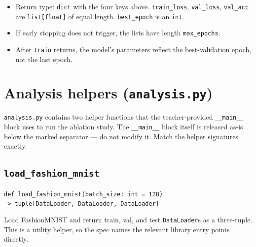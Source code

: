 \documentclass[11pt]{article}
\newcommand{\code}[1]{\texttt{\small #1}}
\begin{document}
\begin{itemize}
    \item Return type: \code{dict} with the four keys above. \code{train\_loss},
          \code{val\_loss}, \code{val\_acc} are \code{list[float]} of equal
          length. \code{best\_epoch} is an \code{int}.
    \item If early stopping does not trigger, the lists have length
          \code{max\_epochs}.
    \item After \code{train} returns, the model's parameters reflect the
          best-validation epoch, not the last epoch.
\end{itemize}

\section{Analysis helpers (\texttt{analysis.py})}

\code{analysis.py} contains two helper functions that the teacher-provided
\code{\_\_main\_\_} block uses to run the ablation study. The \code{\_\_main\_\_}
block itself is released as-is below the marked separator --- do not modify
it. Match the helper signatures exactly.

\subsection{\texttt{load\_fashion\_mnist}}

\noindent
\code{def load\_fashion\_mnist(batch\_size: int = 128)}\\
\code{\hspace*{2em}-> tuple[DataLoader, DataLoader, DataLoader]}

\medskip\noindent
Load FashionMNIST and return train, val, and test \code{DataLoader}s as a
three-tuple. This is a utility helper, so the spec names the relevant
library entry points directly.
\end{document}
